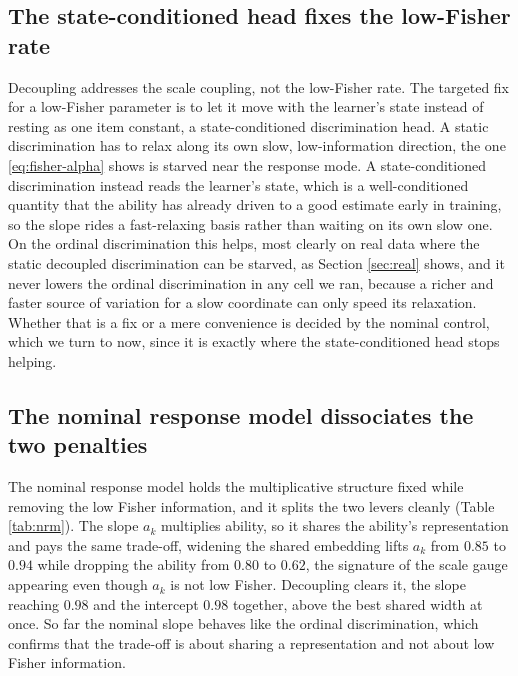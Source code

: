 \documentclass[sigconf,nonacm,screen]{acmart}
\begin{document}
\subsection{The state-conditioned head fixes the low-Fisher rate}
Decoupling addresses the scale coupling, not the low-Fisher rate. The targeted fix
for a low-Fisher parameter is to let it move with the learner's state instead of
resting as one item constant, a state-conditioned discrimination head. A static
discrimination has to relax along its own slow, low-information direction, the one
\eqref{eq:fisher-alpha} shows is starved near the response mode. A
state-conditioned discrimination instead reads the learner's state, which is a
well-conditioned quantity that the ability has already driven to a good estimate
early in training, so the slope rides a fast-relaxing basis rather than waiting on
its own slow one. On the ordinal discrimination this helps, most clearly on real
data where the static decoupled discrimination can be starved, as Section
\ref{sec:real} shows, and it never lowers the ordinal discrimination in any cell we
ran, because a richer and faster source of variation for a slow coordinate can only
speed its relaxation. Whether that is a fix or a mere convenience is decided by the
nominal control, which we turn to now, since it is exactly where the
state-conditioned head stops helping.

\subsection{The nominal response model dissociates the two penalties}
\label{sec:nrm}
The nominal response model holds the multiplicative structure fixed while removing
the low Fisher information, and it splits the two levers cleanly (Table
\ref{tab:nrm}). The slope $a_k$ multiplies ability, so it shares the ability's
representation and pays the same trade-off, widening the shared embedding lifts
$a_k$ from $0.85$ to $0.94$ while dropping the ability from $0.80$ to $0.62$, the
signature of the scale gauge appearing even though $a_k$ is not low Fisher.
Decoupling clears it, the slope reaching $0.98$ and the intercept $0.98$ together,
above the best shared width at once. So far the nominal slope behaves like the
ordinal discrimination, which confirms that the trade-off is about sharing a
representation and not about low Fisher information.
\end{document}
